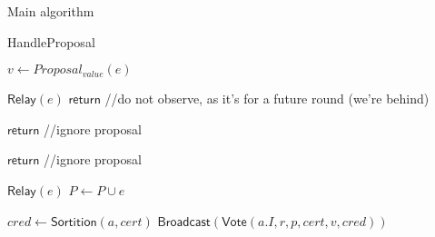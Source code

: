 \documentclass[10pt,a4paper]{article}
\begin{document}
\begin{section}{Main algorithm}
\begin{subsection}{HandleProposal}\label{ssect:handle-proposal}

    \begin{algorithm}[H]
        \caption{\underline{HandleProposal}}
        \label{algo:handle-proposal}
        \begin{algorithmic}[1]

            \State $v \gets Proposal_{value}(e)$

                \State $\mathsf{Relay}(e)$  %
                \State $\mathsf{return}$  //do not observe, as it's for a future round (we're behind)
            \EndIf

                \State $\mathsf{return}$  //ignore proposal
            \EndIf

                \State $\mathsf{return}$ //ignore proposal
            \EndIf

            \State $\mathsf{Relay}(e)$
            \State $P \gets P \cup e$

                    \State $cred \gets 
                    \mathsf{Sortition}(a, cert)$
                        \State $\mathsf{Broadcast}(\mathsf{Vote}(a.I, r, p, cert, v,  cred))$
                    \EndIf
                \EndFor    
            \EndIf

        \EndFunction
        \end{algorithmic}
    \end{algorithm}
    

\end{subsection}
\end{section}
\end{document}
